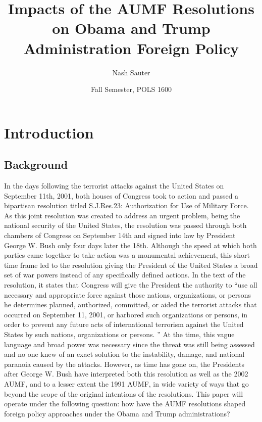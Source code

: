\documentclass[12pt]{article}
\title{Impacts of the AUMF Resolutions on Obama and Trump Administration Foreign Policy}
\author{Nash Sauter}
\date{Fall Semester, POLS 1600}
\begin{document}
\maketitle
{}
\newpage
{}

\section*{Introduction}
\subsection*{Background}
In the days following the terrorist attacks against the United States on September 11th, 2001, both houses of Congress took to action and passed a bipartisan resolution titled S.J.Res.23: Authorization for Use of Military Force.
As this joint resolution was created to address an urgent problem, being the national security of the United States, the resolution was passed through both chambers of Congress on September 14th and signed into law by President George W. Bush only four days later the 18th.
Although the speed at which both parties came together to take action was a monumental achievement, this short time frame led to the resolution giving the President of the United States a broad set of war powers instead of any specifically defined actions.
In the text of the resolution, it states that Congress will give the President the authority to ``use all necessary and appropriate force against those nations, organizations, or persons he determines planned, authorized, committed, or aided the terrorist attacks that occurred on September 11, 2001, or harbored such organizations or persons, in order to prevent any future acts of international terrorism against the United States by such nations, organizations or persons. \autocite{daschle2001}''
At the time, this vague language and broad power was necessary since the threat was still being assessed and no one knew of an exact solution to the instability, damage, and national paranoia caused by the attacks.
However, as time has gone on, the Presidents after George W. Bush have interpreted both this resolution as well as the 2002 AUMF, and to a lesser extent the 1991 AUMF, in wide variety of ways that go beyond the scope of the original intentions of the resolutions.
This paper will operate under the following question: how have the AUMF resolutions shaped foreign policy approaches under the Obama and Trump administrations?
\end{document}
